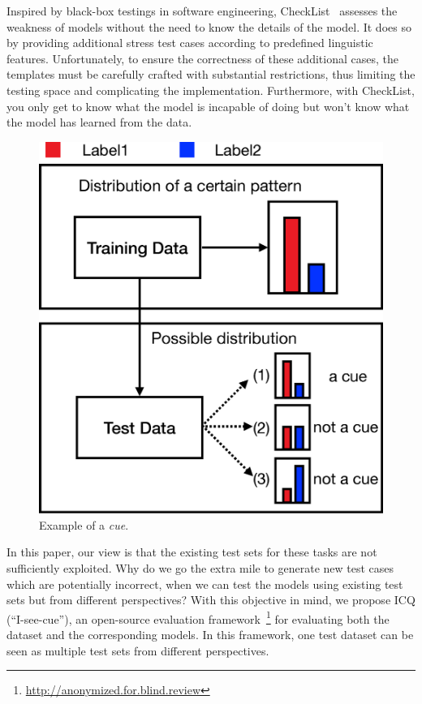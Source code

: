 Inspired by black-box testings in software engineering, 
CheckList~\cite{checklist2020acl} assesses the weakness of 
models without the need to know the details of the model. It does so by
providing additional stress test cases according to predefined 
linguistic features. Unfortunately, to ensure the correctness of
these additional cases, the templates must be carefully crafted
with substantial restrictions, thus limiting the testing space and
complicating the implementation. 
Furthermore, with CheckList, you only get to know what the model 
is incapable of doing but won't know what the model has 
learned from the data.

\begin{figure}[th]
\centering
\includegraphics[width=0.6\columnwidth]{picture/cue_def.eps}
\caption{Example of a {\em cue}. }
\label{fig:cue_def}
\end{figure}

In this paper, our view is that the existing test sets for these
tasks are not sufficiently exploited. Why do we go the extra mile to
generate new test cases which are potentially incorrect, when we can
test the models using existing test sets but from different perspectives?
With this objective in mind, we propose ICQ 
(``I-see-cue''), an open-source evaluation 
framework~\footnote{\url{http://anonymized.for.blind.review}} for 
evaluating both the dataset and the corresponding models. In this framework, 
one test dataset can be seen as multiple test sets from different perspectives. 

